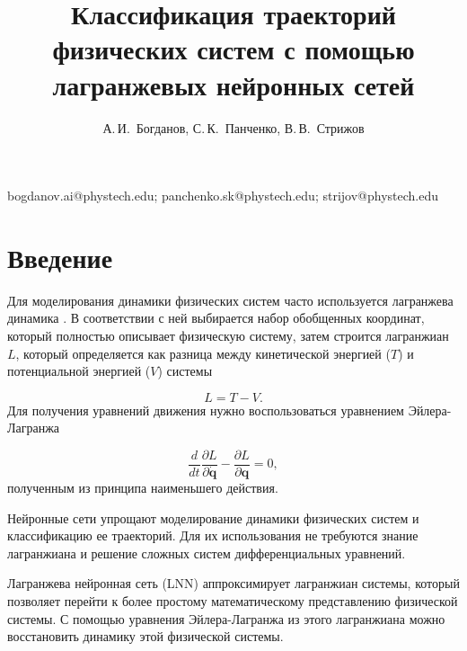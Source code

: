 \documentclass[12pt, twoside]{article}
\begin{document}
\title
    {Классификация траекторий физических систем с помощью лагранжевых нейронных сетей}
\author
    {А.\,И.~Богданов, С.\,К.~Панченко, В.\,В.~Стрижов} 
\email
    {bogdanov.ai@phystech.edu; panchenko.sk@phystech.edu; strijov@phystech.edu}

\maketitle

\section{Введение}
 
    Для моделирования динамики физических систем часто используется лагранжева динамика \cite{landau1976mechanics}. В соответствии с ней выбирается набор обобщенных координат, который полностью описывает физическую систему, затем строится лагранжиан $L$, который определяется как разница между кинетической энергией ($T$) и потенциальной энергией ($V$) системы

    $$L = T - V.$$
    Для получения уравнений движения нужно воспользоваться уравнением Эйлера-Лагранжа

    $$\frac{d}{dt} \frac{\partial L}{\partial \dot{\mathbf{q}}} - \frac{\partial L}{\partial \mathbf{q}} = 0,$$
    полученным из принципа наименьшего действия.

    Нейронные сети упрощают моделирование динамики физических систем и классификацию ее траекторий. Для их использования не требуются знание лагранжиана и решение сложных систем дифференциальных уравнений. 
    
    Лагранжева нейронная сеть (LNN) \cite{cranmer2020lagrangian} аппроксимирует лагранжиан системы, который позволяет перейти к более простому математическому представлению физической системы. С помощью уравнения Эйлера-Лагранжа из этого лагранжиана можно восстановить динамику этой физической системы.
\end{document}
